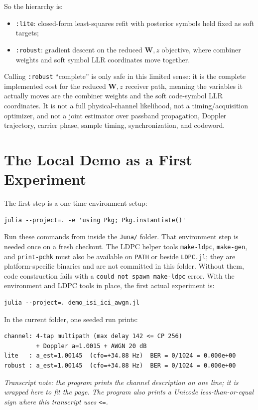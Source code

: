 \documentclass[11pt]{article}
\newcommand{\code}[1]{\texttt{#1}}
\begin{document}
So the hierarchy is:
\begin{itemize}
  \item \code{:lite}: closed-form least-squares refit with posterior symbols
        held fixed as soft targets;
  \item \code{:robust}: gradient descent on the reduced \(\mathbf W,z\) objective, where
        combiner weights and soft symbol LLR coordinates move together.
\end{itemize}

Calling \code{:robust} ``complete'' is only safe in this limited sense: it is the
complete implemented cost for the reduced \(\mathbf W,z\) receiver path, meaning the
variables it actually moves are the combiner weights and the soft code-symbol
LLR coordinates. It is not a full physical-channel likelihood, not a
timing/acquisition
optimizer, and not a joint estimator over passband propagation, Doppler
trajectory, carrier phase, sample timing, synchronization, and codeword.

\section{The Local Demo as a First Experiment}

The first step is a one-time environment setup:
\begin{verbatim}
julia --project=. -e 'using Pkg; Pkg.instantiate()'
\end{verbatim}

Run these commands from inside the \code{Juna/} folder. That environment step is
needed once on a fresh checkout. The LDPC helper tools
\code{make-ldpc}, \code{make-gen}, and \code{print-pchk} must also be available
on \code{PATH} or beside \code{LDPC.jl}; they are platform-specific binaries and
are not committed in this folder. Without them, code construction fails with a
\code{could not spawn make-ldpc} error. With the environment and LDPC tools in
place, the first actual experiment is:
\begin{verbatim}
julia --project=. demo_isi_ici_awgn.jl
\end{verbatim}

In the current folder, one seeded run prints:
\begin{verbatim}
channel: 4-tap multipath (max delay 142 <= CP 256)
         + Doppler a=1.0015 + AWGN 20 dB
lite   : a_est=1.00145  (cfo=+34.88 Hz)  BER = 0/1024 = 0.000e+00
robust : a_est=1.00145  (cfo=+34.88 Hz)  BER = 0/1024 = 0.000e+00
\end{verbatim}
\noindent\emph{Transcript note: the program prints the channel description on
one line; it is wrapped here to fit the page. The program also prints a Unicode
less-than-or-equal sign where this transcript uses \code{<=}.}
\end{document}
